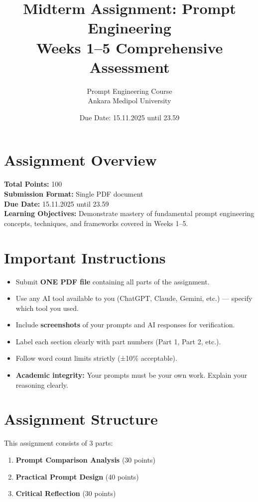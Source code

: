 \documentclass[11pt]{article}
\title{\textbf{Midterm Assignment: Prompt Engineering}\\
\large Weeks 1--5 Comprehensive Assessment}
\author{Prompt Engineering Course\\Ankara Medipol University}
\date{Due Date: 15.11.2025 until 23.59}
\begin{document}
\maketitle

\section*{Assignment Overview}

\textbf{Total Points:} 100\\
\textbf{Submission Format:} Single PDF document\\
\textbf{Due Date:} 15.11.2025 until 23.59\\
\textbf{Learning Objectives:} Demonstrate mastery of fundamental prompt engineering concepts, techniques, and frameworks covered in Weeks 1--5.

\section*{Important Instructions}

\begin{itemize}
    \item Submit \textbf{ONE PDF file} containing all parts of the assignment.
    \item Use any AI tool available to you (ChatGPT, Claude, Gemini, etc.) --- specify which tool you used.
    \item Include \textbf{screenshots} of your prompts and AI responses for verification.
    \item Label each section clearly with part numbers (Part 1, Part 2, etc.).
    \item Follow word count limits strictly (±10\% acceptable).
    \item \textbf{Academic integrity:} Your prompts must be your own work. Explain your reasoning clearly.
\end{itemize}

\section*{Assignment Structure}

This assignment consists of 3 parts:

\begin{enumerate}
    \item \textbf{Prompt Comparison Analysis} (30 points)
    \item \textbf{Practical Prompt Design} (40 points)
    \item \textbf{Critical Reflection} (30 points)
\end{enumerate}
\end{document}
